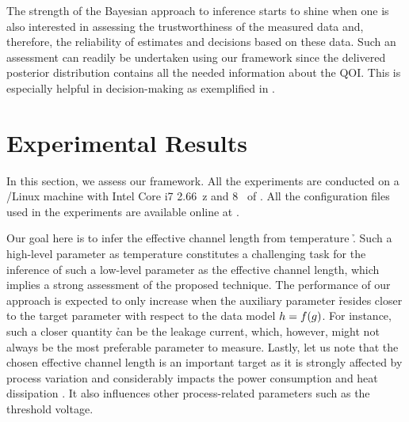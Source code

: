 The strength of the Bayesian approach to inference starts to shine when one is
also interested in assessing the trustworthiness of the measured data and,
therefore, the reliability of estimates and decisions based on these data. Such
an assessment can readily be undertaken using our framework since the delivered
posterior distribution contains all the needed information about the \ac{QOI}.
This is especially helpful in decision-making as exemplified in
.

\section{Experimental Results}

In this section, we assess our framework. All the experiments are conducted on a
/Linux machine with Intel Core i7 2.66~z and 8~ of
. All the configuration files used in the experiments are available
online at \cite{eslab2013}.

Our goal here is to infer the effective channel length \g from temperature \h.
Such a high-level parameter as temperature constitutes a challenging task for
the inference of such a low-level parameter as the effective channel length,
which implies a strong assessment of the proposed technique. The performance of
our approach is expected to only increase when the auxiliary parameter \h
resides closer to the target parameter \g with respect to the data model $h =
f(g)$. For instance, such a closer quantity \h can be the leakage current,
which, however, might not always be the most preferable parameter to measure.
Lastly, let us note that the chosen effective channel length is an important
target as it is strongly affected by process variation and considerably impacts
the power consumption and heat dissipation \cite{chandrakasan2000,
srivastava2010, juan2012}. It also influences other process-related parameters
such as the threshold voltage.

